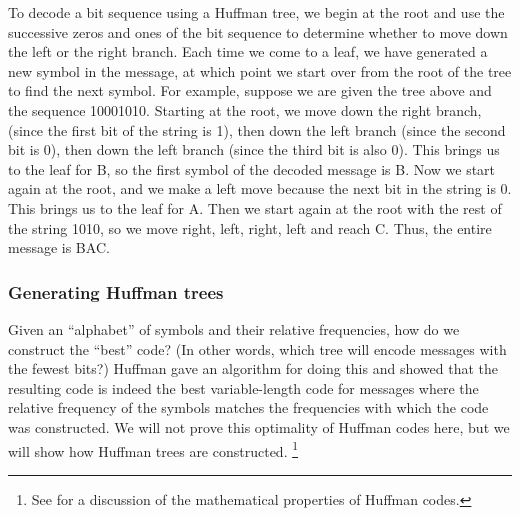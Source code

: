 To decode a bit sequence using a Huffman tree, we begin at the root and use the successive zeros and ones of the bit sequence to determine whether to move down the left or the right branch.
Each time we come to a leaf, we have generated a new symbol in the message, at which point we start over from the root of the tree to find the next symbol.
For example, suppose we are given the tree above and the sequence 10001010.
Starting at the root, we move down the right branch, (since the first bit of the string is 1), then down the left branch (since the second bit is 0), then down the left branch (since the third bit is also 0).
This brings us to the leaf for B, so the first symbol of the decoded message is B.
Now we start again at the root, and we make a left move because the next bit in the string is 0.
This brings us to the leaf for A.
Then we start again at the root with the rest of the string 1010, so we move right, left, right, left and reach C.
Thus, the entire message is BAC.



\subsubsection*{Generating Huffman trees}

Given an “alphabet” of symbols and their relative frequencies, how do we construct the “best” code?
(In other words, which tree will encode messages with the fewest bits?)
Huffman gave an algorithm for doing this and showed that the resulting code is indeed the best variable-length code for messages where the relative frequency of the symbols matches the frequencies with which the code was constructed.
We will not prove this optimality of Huffman codes here, but we will show how Huffman trees are constructed.%
\footnote{
	See  for a discussion of the mathematical properties of Huffman codes.
}

